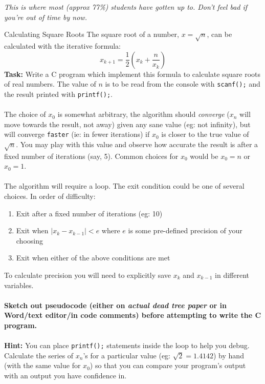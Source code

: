 \documentclass{lab}
\begin{document}
{\huge\textit{This is where most (approx 77\%) students have gotten up to. Don't feel bad if you're out of time by now.}}

\begin{task}{Calculating Square Roots}{}
The square root of a number, $x = \sqrt{n}$, can be calculated with the iterative formula:
\begin{equation}\label{eq:sqrt}
x_{k+1} = \frac{1}{2}\left(x_k + \frac{n}{x_k}\right)
\end{equation}
\textbf{Task:} Write a C program which implement this formula to calculate square roots of real numbers. The value of $n$ is to be read from the console with \texttt{scanf();} and the result printed with \texttt{printf();}.
\\ \\
The choice of $x_0$ is somewhat arbitrary, the algorithm should \textit{converge} ($x_n$ will move towards the result, not away) given any sane value (eg: not infinity), but will converge \texttt{faster} (ie: in fewer iterations) if $x_0$ is closer to the true value of $\sqrt{n}$. You may play with this value and observe how accurate the result is after a fixed number of iterations (say, 5). Common choices for $x_0$ would be $x_0 = n$ or $x_0 = 1$.
\\ \\
The algorithm will require a loop. The exit condition could be one of several choices. In order of difficulty:
\begin{enumerate}
\item Exit after a fixed number of iterations (eg: 10)
\item Exit when $\left| x_k - x_{k-1} \right| < e$ where $e$ is some pre-defined precision of your choosing
\item Exit when either of the above conditions are met
\end{enumerate}

To calculate precision you will need to explicitly save $x_k$ and $x_{k-1}$ in different variables.
\\ \\
\textbf{Sketch out pseudocode (either on \textit{actual dead tree paper} or in Word/text editor/in code comments) before attempting to write the C program.}
\\ \\
\textbf{Hint:} You can place \texttt{printf();} statements inside the loop to help you debug. Calculate the series of $x_n$'s for a particular value (eg: $\sqrt{2}=1.4142$) by hand (with the same value for $x_0$) so that you can compare your program's output with an output you have confidence in.
\end{task}\label{tsk:sqrt}
\end{document}

